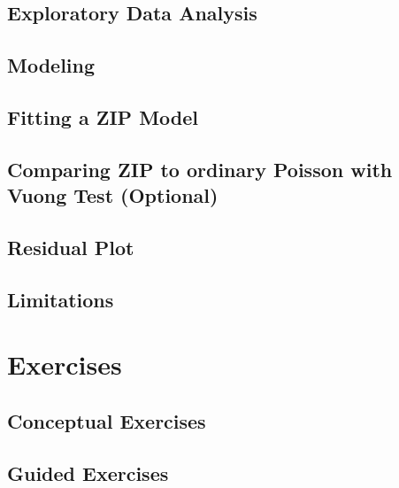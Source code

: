 \documentclass[
]{krantz}
\begin{document}
\hypertarget{exploratory-data-analysis-1}{%
\subsection{Exploratory Data Analysis}\label{exploratory-data-analysis-1}}

\hypertarget{modeling}{%
\subsection{Modeling}\label{modeling}}

\hypertarget{fitting-a-zip-model}{%
\subsection{Fitting a ZIP Model}\label{fitting-a-zip-model}}

\hypertarget{comparing-zip-to-ordinary-poisson-with-vuong-test-optional}{%
\subsection{Comparing ZIP to ordinary Poisson with Vuong Test (Optional)}\label{comparing-zip-to-ordinary-poisson-with-vuong-test-optional}}

\hypertarget{residual-plot}{%
\subsection{Residual Plot}\label{residual-plot}}

\hypertarget{limitations}{%
\subsection{Limitations}\label{limitations}}

\hypertarget{exercises-3}{%
\section{Exercises}\label{exercises-3}}

\hypertarget{exer:concept}{%
\subsection{Conceptual Exercises}\label{exer:concept}}

\hypertarget{guided-exercises-2}{%
\subsection{Guided Exercises}\label{guided-exercises-2}}
\end{document}

